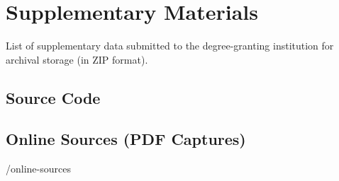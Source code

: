 \chapter{Supplementary Materials}
\label{app:materials}


List of supplementary data submitted to the degree-granting institution for archival storage
(in ZIP format).




\section{Source Code}

\section{Online Sources (PDF Captures)}
\begin{FileList}{/online-sources}
 {\backtrackerfalse\parencite{WikiReliquienschrein2023}}
\end{FileList}




